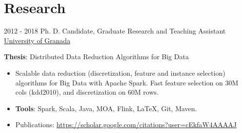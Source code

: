 \documentclass[letterpaper]{twentysecondcv} %
\begin{document}
\section{Research}
\begin{twenty}
	\twentyitem
    	{2012 - 2018}
		{}
        {Ph. D. Candidate, Graduate Research and Teaching Assistant}
        {\href{http://www.ugr.es/}{University of Granada}}
        {}
        {
       	\textbf{Thesis}: Distributed Data Reduction Algorithms for Big Data
        {\begin{itemize}
        \item Scalable data reduction (discretization, feature and instance selection) algorithms for Big Data with Apache Spark. Fast feature selection on 30M cols (kdd2010), and discretization on 60M rows.
        \item \textbf{Tools}: Spark, Scala, Java, MOA, Flink, \LaTeX, Git, Maven.
        \item Publications: \url{https://scholar.google.com/citations?user=cEkfaW4AAAAJ}
		\end{itemize}}
        }
\end{twenty}
\end{document}
